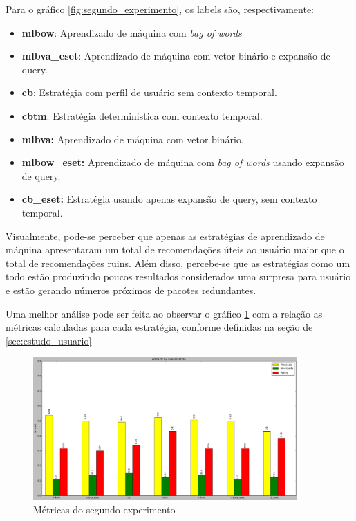 Para o gráfico \ref{fig:segundo_experimento}, os labels são, respectivamente:

\begin{itemize}
    \item \textbf{mlbow}: Aprendizado de máquina com \textit{bag of words}
    \item \textbf{mlbva\_eset}: Aprendizado de máquina com vetor binário e
    expansão de query.
    \item \textbf{cb}: Estratégia com perfil de usuário sem contexto temporal.
    \item \textbf{cbtm}: Estratégia deterministica com contexto temporal.
    \item \textbf{mlbva:} Aprendizado de máquina com vetor binário.
    \item \textbf{mlbow\_eset:} Aprendizado de máquina com \textit{bag of words}
        usando expansão de query.
    \item \textbf{cb\_eset:} Estratégia usando apenas expansão de query, sem
        contexto temporal.
\end{itemize}

Visualmente, pode-se perceber que apenas as estratégias de aprendizado de
máquina apresentaram um total de recomendações úteis ao usuário maior que o
total de recomendações ruins. Além disso, percebe-se que as estratégias como um
todo estão produzindo poucos resultados considerados uma surpresa para usuário e
estão gerando números próximos de pacotes redundantes.

Uma melhor análise pode ser feita ao observar o gráfico
\ref{fig:metricas_segundo_experimento} com a relação as métricas calculadas para cada
estratégia, conforme definidas na seção de \ref{sec:estudo_usuario}

\begin{figure}[h]
  \centering
  \includegraphics[width=0.9\textwidth]{figuras/metricas_segundo_experimento.eps}
  \caption{Métricas do segundo experimento}
  \label{fig:metricas_segundo_experimento}
\end{figure}

